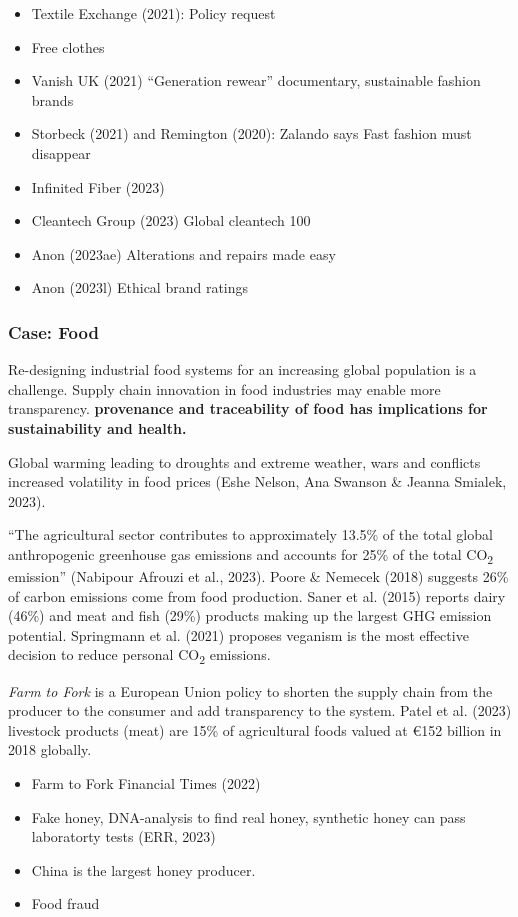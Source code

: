 \documentclass[
  letterpaper,
  DIV=11,
  numbers=noendperiod]{scrartcl}
\begin{document}
\begin{itemize}
\item
  Textile Exchange (2021): Policy request
\item
  Free clothes
\item
  Vanish UK (2021) ``Generation rewear'' documentary, sustainable
  fashion brands
\item
  Storbeck (2021) and Remington (2020): Zalando says Fast fashion must
  disappear
\item
  Infinited Fiber (2023)
\item
  Cleantech Group (2023) Global cleantech 100
\item
  Anon (2023ae) Alterations and repairs made easy
\item
  Anon (2023l) Ethical brand ratings
\end{itemize}

\subsubsection{Case: Food}\label{case-food}

Re-designing industrial food systems for an increasing global population
is a challenge. Supply chain innovation in food industries may enable
more transparency. \textbf{provenance and traceability of food has
implications for sustainability and health.}

Global warming leading to droughts and extreme weather, wars and
conflicts increased volatility in food prices (Eshe Nelson, Ana Swanson
\& Jeanna Smialek, 2023).

``The agricultural sector contributes to approximately 13.5\% of the
total global anthropogenic greenhouse gas emissions and accounts for
25\% of the total CO\textsubscript{2} emission'' (Nabipour Afrouzi et
al., 2023). Poore \& Nemecek (2018) suggests 26\% of carbon emissions
come from food production. Saner et al. (2015) reports dairy (46\%) and
meat and fish (29\%) products making up the largest GHG emission
potential. Springmann et al. (2021) proposes veganism is the most
effective decision to reduce personal CO\textsubscript{2} emissions.

\emph{Farm to Fork} is a European Union policy to shorten the supply
chain from the producer to the consumer and add transparency to the
system. Patel et al. (2023) livestock products (meat) are 15\% of
agricultural foods valued at €152 billion in 2018 globally.

\begin{itemize}
\item
  Farm to Fork Financial Times (2022)
\item
  Fake honey, DNA-analysis to find real honey, synthetic honey can pass
  laboratorty tests (ERR, 2023)
\item
  China is the largest honey producer.
\item
  Food fraud
\end{itemize}
\end{document}
